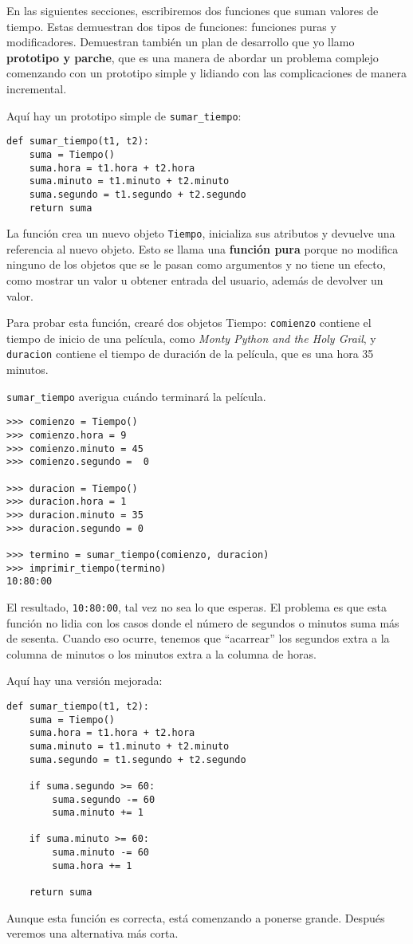 \documentclass[10pt]{book}
\begin{document}
En las siguientes secciones, escribiremos dos funciones que suman valores de
tiempo.  Estas demuestran dos tipos de funciones: funciones puras y
modificadores.  Demuestran también un plan de desarrollo que yo llamo {\bf
  prototipo y parche}, que es una manera de abordar un problema complejo
comenzando con un prototipo simple y lidiando con las complicaciones
de manera incremental.

Aquí hay un prototipo simple de \verb"sumar_tiempo":

\begin{verbatim}
def sumar_tiempo(t1, t2):
    suma = Tiempo()
    suma.hora = t1.hora + t2.hora
    suma.minuto = t1.minuto + t2.minuto
    suma.segundo = t1.segundo + t2.segundo
    return suma
\end{verbatim}
%
La función crea un nuevo objeto {\tt Tiempo}, inicializa sus
atributos y devuelve una referencia al nuevo objeto.  Esto se llama
una {\bf función pura} porque no modifica ninguno de los objetos
que se le pasan como argumentos y no tiene un efecto,
como mostrar un valor u obtener entrada del usuario,
además de devolver un valor.

Para probar esta función, crearé dos objetos Tiempo: {\tt comienzo}
contiene el tiempo de inicio de una película, como {\em Monty Python and the
Holy Grail}, y {\tt duracion} contiene el tiempo de duración de la película,
que es una hora 35 minutos.

\verb"sumar_tiempo" averigua cuándo terminará la película.

\begin{verbatim}
>>> comienzo = Tiempo()
>>> comienzo.hora = 9
>>> comienzo.minuto = 45
>>> comienzo.segundo =  0

>>> duracion = Tiempo()
>>> duracion.hora = 1
>>> duracion.minuto = 35
>>> duracion.segundo = 0

>>> termino = sumar_tiempo(comienzo, duracion)
>>> imprimir_tiempo(termino)
10:80:00
\end{verbatim}
%
El resultado, {\tt 10:80:00}, tal vez no sea lo que
esperas.  El problema es que esta función no lidia con los casos donde el
número de segundos o minutos suma más de sesenta.  Cuando eso
ocurre, tenemos que ``acarrear'' los segundos extra a la columna de minutos
o los minutos extra a la columna de horas.

Aquí hay una versión mejorada:

\begin{verbatim}
def sumar_tiempo(t1, t2):
    suma = Tiempo()
    suma.hora = t1.hora + t2.hora
    suma.minuto = t1.minuto + t2.minuto
    suma.segundo = t1.segundo + t2.segundo

    if suma.segundo >= 60:
        suma.segundo -= 60
        suma.minuto += 1

    if suma.minuto >= 60:
        suma.minuto -= 60
        suma.hora += 1

    return suma
\end{verbatim}
%
Aunque esta función es correcta, está comenzando a ponerse grande.
Después veremos una alternativa más corta.
\end{document}
